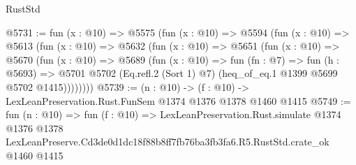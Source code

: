 \begin{lexlean}{RustStd}
\begin{coremodule}
@5731 := fun (x : @10) =>
  @5575
    (fun (x : @10) =>
    @5594
      (fun (x : @10) =>
      @5613
        (fun (x : @10) =>
        @5632
          (fun (x : @10) =>
          @5651
            (fun (x : @10) =>
            @5670
              (fun (x : @10) =>
              @5689
                (fun (x : @10) =>
                fun (fn : @7) =>
                fun (h : @5693) =>
                @5701 @5702 (Eq.refl.{2} (Sort 1) @7) (heq_of_eq.{1} @1399 @5699 @5702 @1415))))))))
@5739 := (n : @10) -> (f : @10) -> LexLeanPreservation.Rust.FunSem @1374 @1376 @1378 @1460 @1415
@5749 := fun (n : @10) =>
  fun (f : @10) =>
  LexLeanPreservation.Rust.simulate
    @1374
    @1376
    @1378
    LexLeanPreserve.Cd3de0d1dc18f88b8ff7fb76ba3fb3fa6.R5.RustStd.crate_ok
    @1460
    @1415
\end{coremodule}
\end{lexlean}
